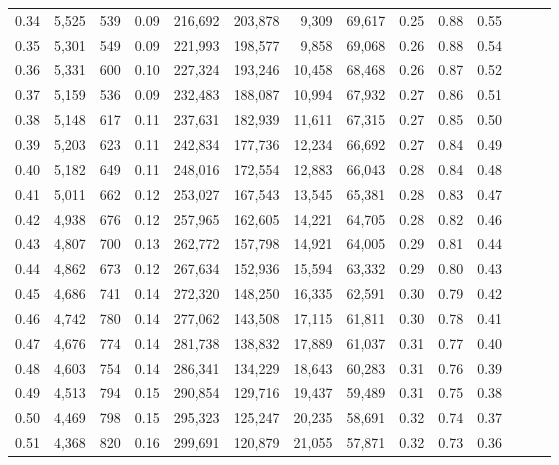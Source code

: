 \begin{tabular}{rrrrrrrrrrrrrr}
0.34 &   5,525 &    539 &  0.09 &  216,692 &  203,878 &   9,309 &  69,617 &  0.25 &  0.88 &      0.55 \\
0.35 &   5,301 &    549 &  0.09 &  221,993 &  198,577 &   9,858 &  69,068 &  0.26 &  0.88 &      0.54 \\
0.36 &   5,331 &    600 &  0.10 &  227,324 &  193,246 &  10,458 &  68,468 &  0.26 &  0.87 &      0.52 \\
0.37 &   5,159 &    536 &  0.09 &  232,483 &  188,087 &  10,994 &  67,932 &  0.27 &  0.86 &      0.51 \\
0.38 &   5,148 &    617 &  0.11 &  237,631 &  182,939 &  11,611 &  67,315 &  0.27 &  0.85 &      0.50 \\
0.39 &   5,203 &    623 &  0.11 &  242,834 &  177,736 &  12,234 &  66,692 &  0.27 &  0.84 &      0.49 \\
0.40 &   5,182 &    649 &  0.11 &  248,016 &  172,554 &  12,883 &  66,043 &  0.28 &  0.84 &      0.48 \\
0.41 &   5,011 &    662 &  0.12 &  253,027 &  167,543 &  13,545 &  65,381 &  0.28 &  0.83 &      0.47 \\
0.42 &   4,938 &    676 &  0.12 &  257,965 &  162,605 &  14,221 &  64,705 &  0.28 &  0.82 &      0.46 \\
0.43 &   4,807 &    700 &  0.13 &  262,772 &  157,798 &  14,921 &  64,005 &  0.29 &  0.81 &      0.44 \\
0.44 &   4,862 &    673 &  0.12 &  267,634 &  152,936 &  15,594 &  63,332 &  0.29 &  0.80 &      0.43 \\
0.45 &   4,686 &    741 &  0.14 &  272,320 &  148,250 &  16,335 &  62,591 &  0.30 &  0.79 &      0.42 \\
0.46 &   4,742 &    780 &  0.14 &  277,062 &  143,508 &  17,115 &  61,811 &  0.30 &  0.78 &      0.41 \\
0.47 &   4,676 &    774 &  0.14 &  281,738 &  138,832 &  17,889 &  61,037 &  0.31 &  0.77 &      0.40 \\
0.48 &   4,603 &    754 &  0.14 &  286,341 &  134,229 &  18,643 &  60,283 &  0.31 &  0.76 &      0.39 \\
0.49 &   4,513 &    794 &  0.15 &  290,854 &  129,716 &  19,437 &  59,489 &  0.31 &  0.75 &      0.38 \\
0.50 &   4,469 &    798 &  0.15 &  295,323 &  125,247 &  20,235 &  58,691 &  0.32 &  0.74 &      0.37 \\
0.51 &   4,368 &    820 &  0.16 &  299,691 &  120,879 &  21,055 &  57,871 &  0.32 &  0.73 &      0.36 \\

\end{tabular}
